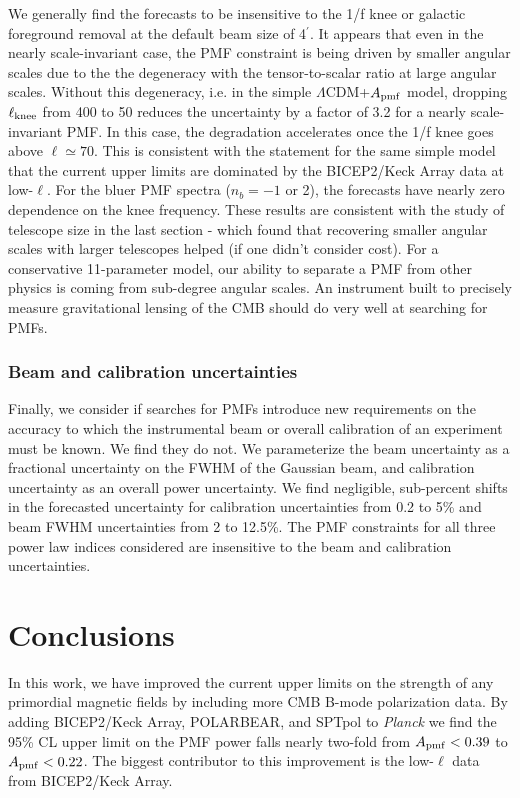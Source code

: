 \documentclass[apj]{emulateapj}
\newcommand{\apmf}{\ensuremath{A_{\rm pmf}}}
\newcommand{\lcdm}{\ensuremath{\Lambda}CDM}
\newcommand{\lknee}{\ensuremath{\ell_{\rm knee}}}
\newcommand{\planck}{{\sl Planck}}
\newcommand{\bicepkeck}{BICEP2/Keck Array}
\newcommand{\pb}{POLARBEAR}
\newcommand{\sptpol}{SPTpol}
\begin{document}
We generally find the forecasts to be insensitive to the 1/f knee or galactic foreground removal at the default beam size of 4$^\prime$. 
It appears that even in the nearly scale-invariant case, the PMF constraint is being driven by smaller angular scales due to the the degeneracy with the tensor-to-scalar ratio at large angular scales. 
Without this degeneracy, i.e. in the simple \lcdm{}+\apmf{} model, dropping \lknee{} from 400 to 50 reduces the uncertainty by a factor of 3.2 for a nearly scale-invariant PMF. 
In this case, the degradation accelerates once the 1/f knee goes above $\ell \simeq 70$. 
This is consistent with the statement for the same simple model that the current upper limits are dominated by the BICEP2/Keck Array data at low-$\ell$. 
For the bluer PMF spectra ($n_b=-1$ or 2), the forecasts have nearly zero dependence on the knee frequency. 
These results are consistent with the study of telescope size in the last section - which found that recovering smaller angular scales with larger telescopes helped (if one didn't consider cost).
For a conservative 11-parameter model, our ability to separate a PMF from other physics is coming from sub-degree angular scales. 
An instrument built to precisely measure gravitational lensing of the CMB should do very well at searching for PMFs. 


\subsubsection{Beam and calibration uncertainties}

Finally, we consider if searches for PMFs introduce new requirements on the accuracy to which the instrumental beam or overall calibration of an experiment must be known. 
We find they do not. 
We parameterize the beam uncertainty as a fractional uncertainty on the FWHM of the Gaussian beam, and calibration uncertainty as an overall power uncertainty. 
We find negligible, sub-percent shifts in the forecasted uncertainty for calibration uncertainties from 0.2 to 5\% and beam FWHM uncertainties from 2 to 12.5\%. 
The PMF constraints  for all three power law indices considered are insensitive to the beam and calibration uncertainties. 

\section{Conclusions}
\label{sec:conclusions}

In this work, we have improved the current upper limits on the strength of any primordial magnetic fields by including more CMB B-mode polarization data. 
By adding \bicepkeck{}, \pb, and \sptpol{} to \planck{} we find the 95\% CL upper limit on the PMF power falls nearly two-fold from $\apmf < \upperAplk$ to $\apmf < \upperAall$. 
The biggest contributor to this improvement is the low-$\ell$ data from \bicepkeck{}. 
\end{document}
